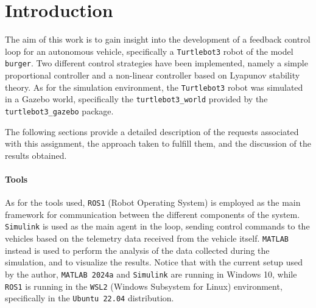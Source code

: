 \section{Introduction}
\label{sec:introduction}

The aim of this work is to gain insight into the development of a feedback control loop for an autonomous vehicle, specifically a \texttt{Turtlebot3} robot of the model \texttt{burger}.
Two different control strategies have been implemented, namely a simple proportional controller and a non-linear controller based on Lyapunov stability theory.
As for the simulation environment, the \texttt{Turtlebot3} robot was simulated in a Gazebo world, specifically the \texttt{turtlebot3\_world} provided by the \texttt{turtlebot3\_gazebo} package.

The following sections provide a detailed description of the requests associated with this assignment, the approach taken to fulfill them, and the discussion of the results obtained.

\paragraph{Tools}

As for the tools used, \texttt{ROS1} (Robot Operating System) is employed as the main framework for communication between the different components of the system.
\texttt{Simulink} is used as the main agent in the loop, sending control commands to the vehicles based on the telemetry data received from the vehicle itself.
\texttt{MATLAB} instead is used to perform the analysis of the data collected during the simulation, and to visualize the results.
Notice that with the current setup used by the author, \texttt{MATLAB 2024a} and \texttt{Simulink} are running in Windows 10, while \texttt{ROS1} is running in the \texttt{WSL2} (Windows Subsystem for Linux) environment, specifically in the \texttt{Ubuntu 22.04} distribution.
